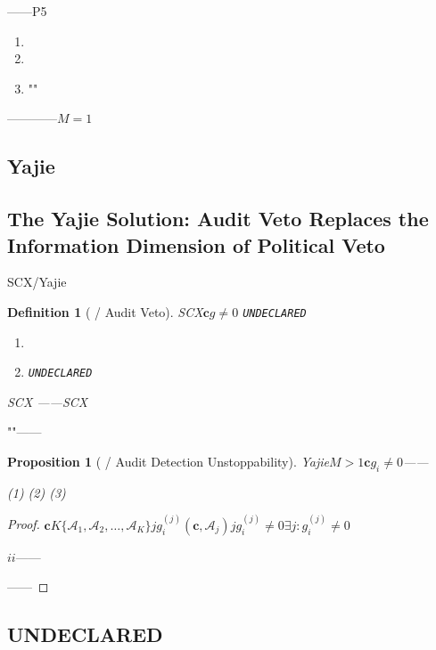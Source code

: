 \documentclass[12pt,a4paper]{article}
\newtheorem{proposition}[theorem]{Proposition}
\newtheorem{definition}[theorem]{Definition}
\theoremstyle{remark}
\newcommand{\UNDECLARED}{\texttt{UNDECLARED}}
\newcommand{\auditnode}{\mathcal{A}}
\newcommand{\gradient}{g}
\begin{document}
——\textbf{}P5

\begin{enumerate}[label=(\arabic*)]
    \item 
    \item 
    \item ""
\end{enumerate}

\textbf{}————$M=1$

\subsection{Yajie}
\subsection{The Yajie Solution: Audit Veto Replaces the Information Dimension of Political Veto}

SCX/Yajie\textbf{}\textbf{}

\begin{definition}[ / Audit Veto]\label{def:audit_veto}
    SCX\textbf{}$\mathbf{c}$$g \neq 0$
    \UNDECLARED{}\textbf{}
    \begin{enumerate}[label=(\arabic*)]
        \item \textbf{}\textbf{}\textbf{}
        \item \textbf{}\textbf{}\UNDECLARED{}\textbf{}
    \end{enumerate}
    SCX\textbf{}
    \textbf{}
    ——SCX
\end{definition}

""\textbf{}\textbf{}——\textbf{}

\begin{proposition}[ / Audit Detection Unstoppability]\label{prop:detection_unstoppability}
    Yajie$M>1$$\mathbf{c}$$\gradient_i \neq 0$\textbf{}——
    
    \textbf{}(1) (2) (3) \textbf{}
\end{proposition}

\begin{proof}
    $\mathbf{c}$$K$$\{\auditnode_1, \auditnode_2, \ldots, \auditnode_K\}$$j$$\gradient_i^{(j)}(\mathbf{c}, \auditnode_j)$$j$$\gradient_i^{(j)} \neq 0$$\exists j: \gradient_i^{(j)} \neq 0$

    $i$$i$——\textbf{}
    
    ——
\end{proof}

\subsection{UNDECLARED}
\end{document}
